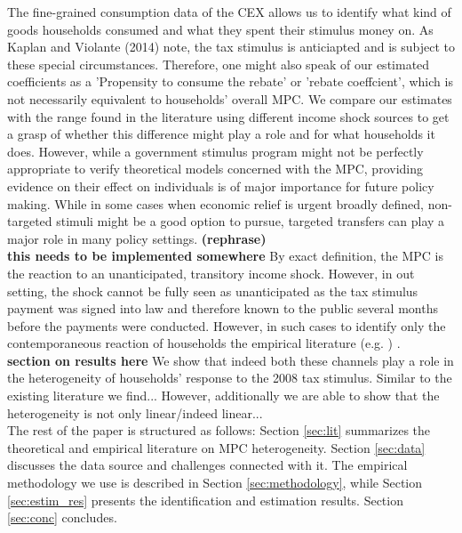 The fine-grained consumption data of the CEX allows us to identify what kind of goods households consumed and what they spent their stimulus money on. As Kaplan and Violante (2014) note, the tax stimulus is anticiapted and is subject to these special circumstances. Therefore, one might also speak of our estimated coefficients as a 'Propensity to consume the rebate' or 'rebate coeffcient', which is not necessarily equivalent to households' overall MPC. We compare our estimates with the range found in the literature using different income shock sources to get a grasp of whether this difference might play a role and for what households it does. However, while a government stimulus program might not be perfectly appropriate to verify theoretical models concerned with the MPC, providing evidence on their effect on individuals is of major importance for future policy making. While in some cases when economic relief is urgent broadly defined, non-targeted stimuli might be a good option to pursue, targeted transfers can play a major role in many policy settings. \textbf{(rephrase)}\\ 

\textbf{this needs to be implemented somewhere}
By exact definition, the MPC is the reaction to an unanticipated, transitory income shock. However, in out setting, the shock cannot be fully seen as unanticipated as the tax stimulus payment was signed into law and therefore known to the public several months before the payments were conducted. However, in such cases to identify only the contemporaneous reaction of households the empirical literature (e.g. \cite{parker_etal_13}) .  \\ 

\textbf{section on results here}
We show that indeed both these channels play a role in the heterogeneity of households' response to the 2008 tax stimulus. Similar to the existing literature we find... However, additionally we are able to show that the heterogeneity is not only linear/indeed linear... \\ 
The rest of the paper is structured as follows: Section \ref{sec:lit} summarizes the theoretical and empirical literature on MPC heterogeneity. Section \ref{sec:data} discusses the data source and challenges connected with it. The empirical methodology we use is described in Section \ref{sec:methodology}, while Section \ref{sec:estim_res} presents the identification and estimation results. Section \ref{sec:conc} concludes.